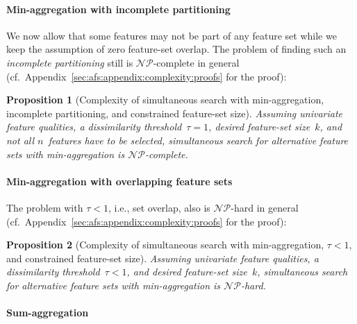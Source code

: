 \documentclass{article}
\newtheorem{proposition}{Proposition}
\theoremstyle{definition}
\begin{document}
\paragraph{Min-aggregation with incomplete partitioning}

We now allow that some features may not be part of any feature set while we keep the assumption of zero feature-set overlap.
The problem of finding such an \emph{incomplete partitioning} still is $\mathcal{NP}$-complete in general (cf.~Appendix~\ref{sec:afs:appendix:complexity:proofs} for the proof):
%
\begin{proposition}[Complexity of simultaneous search with min-aggregation, incomplete partitioning, and constrained feature-set size]
	Assuming univariate feature qualities, a dissimilarity threshold~$\tau = 1$, desired feature-set size~$k$, and \emph{not} all $n$~features have to be selected, simultaneous search for alternative feature sets with min-aggregation is $\mathcal{NP}$-complete.
	\label{prop:afs:complexity-incomplete-partitioning-min-constrained-k}
\end{proposition}

\paragraph{Min-aggregation with overlapping feature sets}

The problem with $\tau < 1$, i.e., set overlap, also is $\mathcal{NP}$-hard in general (cf.~Appendix~\ref{sec:afs:appendix:complexity:proofs} for the proof):
%
\begin{proposition}[Complexity of simultaneous search with min-aggregation, $\tau < 1$, and constrained feature-set size]
	Assuming univariate feature qualities, a dissimilarity threshold~$\tau < 1$, and desired feature-set size~$k$, simultaneous search for alternative feature sets with min-aggregation is $\mathcal{NP}$-hard.
	\label{prop:afs:complexity-no-partitioning-min-constrained-k}
\end{proposition}

\paragraph{Sum-aggregation}
\end{document}
